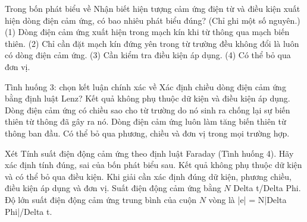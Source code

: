 \begin{ex}
Trong bốn phát biểu về Nhận biết hiện tượng cảm ứng điện từ và điều kiện xuất hiện dòng điện cảm ứng, có bao nhiêu phát biểu đúng? (Chỉ ghi một số nguyên.) (1) Dòng điện cảm ứng xuất hiện trong mạch kín khi từ thông qua mạch biến thiên. (2) Chỉ cần đặt mạch kín đứng yên trong từ trường đều không đổi là luôn có dòng điện cảm ứng. (3) Cần kiểm tra điều kiện áp dụng. (4) Có thể bỏ qua đơn vị.
\end{ex}

\begin{ex}
Tình huống 3: chọn kết luận chính xác về Xác định chiều dòng điện cảm ứng bằng định luật Lenz?
\choice
{Kết quả không phụ thuộc dữ kiện và điều kiện áp dụng.}
{\True Dòng điện cảm ứng có chiều sao cho từ trường do nó sinh ra chống lại sự biến thiên từ thông đã gây ra nó.}
{Dòng điện cảm ứng luôn làm tăng biến thiên từ thông ban đầu.}
{Có thể bỏ qua phương, chiều và đơn vị trong mọi trường hợp.}
\end{ex}

\begin{ex}
Xét Tính suất điện động cảm ứng theo định luật Faraday (Tình huống 4). Hãy xác định tính đúng, sai của bốn phát biểu sau.
\choiceTF
{Kết quả không phụ thuộc dữ kiện và có thể bỏ qua điều kiện.}
{\True Khi giải cần xác định đúng dữ kiện, phương chiều, điều kiện áp dụng và đơn vị.}
{Suất điện động cảm ứng bằng $N$ Delta t/Delta Phi.}
{\True Độ lớn suất điện động cảm ứng trung bình của cuộn $N$ vòng là |e| = N|Delta Phi|/Delta t.}
\end{ex}


